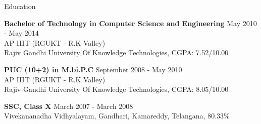 \documentclass{resume} %
\begin{document}
\begin{rSection}{Education}

  {\bf Bachelor of Technology in Computer Science and Engineering} \hfill {May 2010 - May 2014}
  \\ 
  AP IIIT (RGUKT - R.K Valley)
  \\
  Rajiv Gandhi University Of Knowledge Technologies,  CGPA: 7.52/10.00  
  
  {\bf PUC (10+2) in M.bi.P.C} \hfill {September 2008 - May 2010}
  \\
  AP IIIT (RGUKT - R.K Valley)
  \\
  Rajiv Gandhi University Of Knowledge Technologies,  CGPA: 8.05/10.00  
  
  {\textbf{SSC, Class X}}  \hfill March 2007 - March  2008\\
  Vivekananadha Vidhyalayam, Gandhari, Kamareddy, Telangana, 80.33\% 

\end{rSection}

\end{document}
